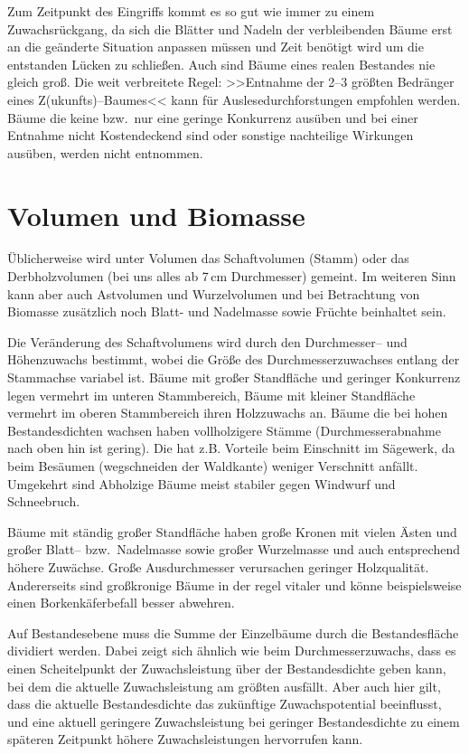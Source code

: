 \documentclass[twocolumn]{scrartcl}
\begin{document}
Zum Zeitpunkt des Eingriffs kommt es so gut wie immer zu einem Zuwachsrückgang,
da sich die Blätter und Nadeln der verbleibenden Bäume erst an die geänderte
Situation anpassen müssen und Zeit benötigt wird um die entstanden Lücken zu
schließen. Auch sind Bäume eines realen Bestandes nie gleich groß. Die weit
verbreitete Regel: >>Entnahme der 2--3 größten Bedränger eines
Z(ukunfts)--Baumes<< kann für Auslesedurchforstungen empfohlen werden. Bäume die
keine bzw.\ nur eine geringe Konkurrenz ausüben und bei einer Entnahme nicht
Kostendeckend sind oder sonstige nachteilige Wirkungen ausüben, werden nicht
entnommen.

\section{Volumen und Biomasse}

Üblicherweise wird unter Volumen das Schaftvolumen (Stamm) oder das
Derbholzvolumen (bei uns alles ab 7\,cm Durchmesser) gemeint. Im weiteren Sinn
kann aber auch Astvolumen und Wurzelvolumen und bei Betrachtung von Biomasse
zusätzlich noch Blatt- und Nadelmasse sowie Früchte beinhaltet sein.

Die Veränderung des Schaftvolumens wird durch den Durchmesser-- und Höhenzuwachs
bestimmt, wobei die Größe des Durchmesserzuwachses entlang der Stammachse
variabel ist. Bäume mit großer Standfläche und geringer Konkurrenz legen
vermehrt im unteren Stammbereich, Bäume mit kleiner Standfläche vermehrt im
oberen Stammbereich ihren Holzzuwachs an. Bäume die bei hohen Bestandesdichten
wachsen haben vollholzigere Stämme (Durchmesserabnahme nach oben hin ist
gering). Die hat z.B. Vorteile beim Einschnitt im Sägewerk, da beim Besäumen
(wegschneiden der Waldkante) weniger Verschnitt anfällt. Umgekehrt sind
Abholzige Bäume meist stabiler gegen Windwurf und Schneebruch.

Bäume mit ständig großer Standfläche haben große Kronen mit vielen Ästen und
großer Blatt-- bzw.\ Nadelmasse sowie großer Wurzelmasse und auch entsprechend
höhere Zuwächse. Große Ausdurchmesser verursachen geringer Holzqualität.
Andererseits sind großkronige Bäume in der regel vitaler und könne
beispielsweise einen Borkenkäferbefall besser abwehren.

Auf Bestandesebene muss die Summe der Einzelbäume durch die Bestandesfläche
dividiert werden. Dabei zeigt sich ähnlich wie beim Durchmesserzuwachs, dass es
einen Scheitelpunkt der Zuwachsleistung über der Bestandesdichte geben kann, bei
dem die aktuelle Zuwachsleistung am größten ausfällt. Aber auch hier gilt, dass
die aktuelle Bestandesdichte das zukünftige Zuwachspotential beeinflusst, und
eine aktuell geringere Zuwachsleistung bei geringer Bestandesdichte zu einem
späteren Zeitpunkt höhere Zuwachsleistungen hervorrufen kann.
\end{document}
